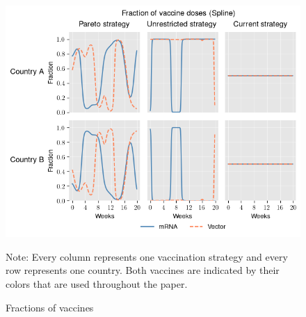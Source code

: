 \begin{figure}[h!]
\centering
\includegraphics[scale=0.85]{images/splines_vaccine_fractions.png}\\
\begin{flushleft}
\scriptsize{Note:} Every column represents one vaccination strategy and every row represents one country. Both vaccines are indicated by their colors that are used throughout the paper. 
\end{flushleft}
\caption{Fractions of vaccines}
\label{fig:results_splines_allocation_fractions}
\end{figure}

\clearpage
